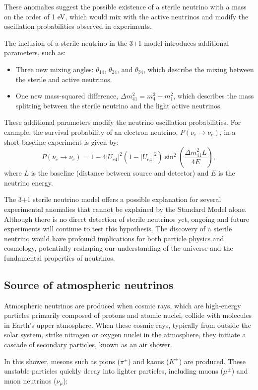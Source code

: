 \documentclass[a4paper,12pt,numbered]{article}
\begin{document}
These anomalies suggest the possible existence of a sterile neutrino with a mass on the order of 1 eV, which would mix with the active neutrinos and modify the oscillation probabilities observed in experiments.


The inclusion of a sterile neutrino in the 3+1 model introduces additional parameters, such as:
\begin{itemize}
    \item Three new mixing angles: $\theta_{14}$, $\theta_{24}$, and $\theta_{34}$, which describe the mixing between the sterile and active neutrinos.
    \item One new mass-squared difference, $\Delta m_{41}^2 = m_4^2 - m_1^2$, which describes the mass splitting between the sterile neutrino and the light active neutrinos.
\end{itemize}

These additional parameters modify the neutrino oscillation probabilities. For example, the survival probability of an electron neutrino, $P(\nu_e \rightarrow \nu_e)$, in a short-baseline experiment is given by:
\[
P(\nu_e \rightarrow \nu_e) = 1 - 4 |U_{e4}|^2 (1 - |U_{e4}|^2) \sin^2 \left( \frac{\Delta m_{41}^2 L}{4E} \right),
\]
where $L$ is the baseline (distance between source and detector) and $E$ is the neutrino energy.


The 3+1 sterile neutrino model offers a possible explanation for several experimental anomalies that cannot be explained by the Standard Model alone. Although there is no direct detection of sterile neutrinos yet, ongoing and future experiments will continue to test this hypothesis. The discovery of a sterile neutrino would have profound implications for both particle physics and cosmology, potentially reshaping our understanding of the universe and the fundamental properties of neutrinos.

\subsection{Source of atmospheric neutrinos}

Atmospheric neutrinos are produced when cosmic rays, which are high-energy particles primarily composed of protons and atomic nuclei, collide with molecules in Earth's upper atmosphere. When these cosmic rays, typically from outside the solar system, strike nitrogen or oxygen nuclei in the atmosphere, they initiate a cascade of secondary particles, known as an air shower.

In this shower, mesons such as pions (\(\pi^\pm\)) and kaons (\(K^\pm\)) are produced. These unstable particles quickly decay into lighter particles, including muons (\(\mu^\pm\)) and muon neutrinos (\(\nu_\mu\)):
\end{document}
